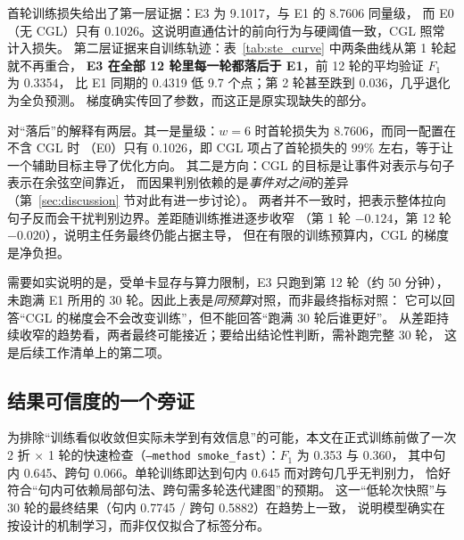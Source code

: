 首轮训练损失给出了第一层证据：E3 为 9.1017，与 E1 的 8.7606 同量级，
而 E0（无 CGL）只有 0.1026。这说明直通估计的前向行为与硬阈值一致，CGL 照常计入损失。
第二层证据来自训练轨迹：表~\ref{tab:ste_curve} 中两条曲线从第 1 轮起就不再重合，
\textbf{E3 在全部 12 轮里每一轮都落后于 E1}，前 12 轮的平均验证 $F_1$ 为 0.3354，
比 E1 同期的 0.4319 低 9.7 个点；第 2 轮甚至跌到 0.036，几乎退化为全负预测。
梯度确实传回了参数，而这正是原实现缺失的部分。

对“落后”的解释有两层。其一是量级：$w=6$ 时首轮损失为 8.7606，而同一配置在不含 CGL 时
（E0）只有 0.1026，即 CGL 项占了首轮损失的 99\% 左右，等于让一个辅助目标主导了优化方向。
其二是方向：CGL 的目标是让事件对表示与句子表示在余弦空间靠近，
而因果判别依赖的是\emph{事件对之间}的差异（第~\ref{sec:discussion} 节对此有进一步讨论）。
两者并不一致时，把表示整体拉向句子反而会干扰判别边界。差距随训练推进逐步收窄
（第 1 轮 $-0.124$，第 12 轮 $-0.020$），说明主任务最终仍能占据主导，
但在有限的训练预算内，CGL 的梯度是净负担。

需要如实说明的是，受单卡显存与算力限制，E3 只跑到第 12 轮（约 50 分钟），
未跑满 E1 所用的 30 轮。因此上表是\emph{同预算}对照，而非最终指标对照：
它可以回答“CGL 的梯度会不会改变训练”，但不能回答“跑满 30 轮后谁更好”。
从差距持续收窄的趋势看，两者最终可能接近；要给出结论性判断，需补跑完整 30 轮，
这是后续工作清单上的第二项。

\subsection{结果可信度的一个旁证}

为排除“训练看似收敛但实际未学到有效信息”的可能，本文在正式训练前做了一次
2 折 $\times$ 1 轮的快速检查（\texttt{--method smoke\_fast}）：$F_1$ 为 0.353 与 0.360，
其中句内 0.645、跨句 0.066。单轮训练即达到句内 0.645 而对跨句几乎无判别力，
恰好符合“句内可依赖局部句法、跨句需多轮迭代建图”的预期。
这一“低轮次快照”与 30 轮的最终结果（句内 0.7745 / 跨句 0.5882）在趋势上一致，
说明模型确实在按设计的机制学习，而非仅仅拟合了标签分布。

